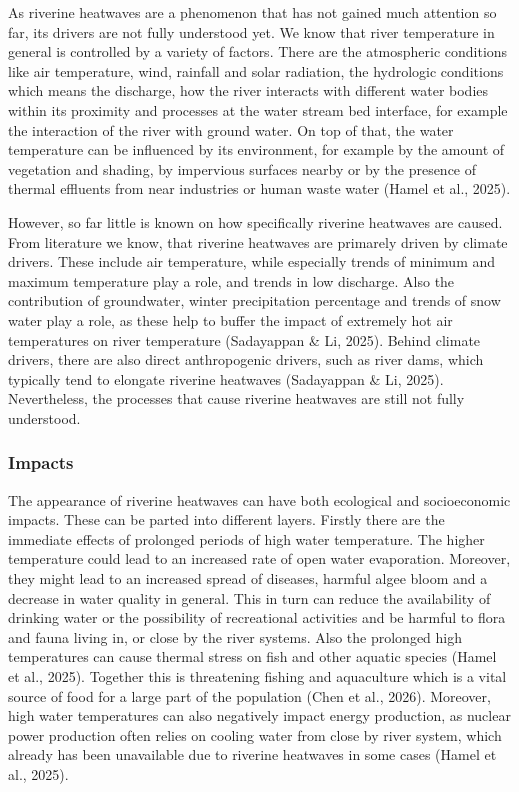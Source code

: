 \documentclass[
]{article}
\begin{document}
As riverine heatwaves are a phenomenon that has not gained much
attention so far, its drivers are not fully understood yet. We know that
river temperature in general is controlled by a variety of factors.
There are the atmospheric conditions like air temperature, wind,
rainfall and solar radiation, the hydrologic conditions which means the
discharge, how the river interacts with different water bodies within
its proximity and processes at the water stream bed interface, for
example the interaction of the river with ground water. On top of that,
the water temperature can be influenced by its environment, for example
by the amount of vegetation and shading, by impervious surfaces nearby
or by the presence of thermal effluents from near industries or human
waste water (Hamel et al., 2025).

However, so far little is known on how specifically riverine heatwaves
are caused. From literature we know, that riverine heatwaves are
primarely driven by climate drivers. These include air temperature,
while especially trends of minimum and maximum temperature play a role,
and trends in low discharge. Also the contribution of groundwater,
winter precipitation percentage and trends of snow water play a role, as
these help to buffer the impact of extremely hot air temperatures on
river temperature (Sadayappan \& Li, 2025). Behind climate drivers,
there are also direct anthropogenic drivers, such as river dams, which
typically tend to elongate riverine heatwaves (Sadayappan \& Li, 2025).
Nevertheless, the processes that cause riverine heatwaves are still not
fully understood.

\subsubsection{Impacts}\label{impacts}

The appearance of riverine heatwaves can have both ecological and
socioeconomic impacts. These can be parted into different layers.
Firstly there are the immediate effects of prolonged periods of high
water temperature. The higher temperature could lead to an increased
rate of open water evaporation. Moreover, they might lead to an
increased spread of diseases, harmful algee bloom and a decrease in
water quality in general. This in turn can reduce the availability of
drinking water or the possibility of recreational activities and be
harmful to flora and fauna living in, or close by the river systems.
Also the prolonged high temperatures can cause thermal stress on fish
and other aquatic species (Hamel et al., 2025). Together this is
threatening fishing and aquaculture which is a vital source of food for
a large part of the population (Chen et al., 2026). Moreover, high water
temperatures can also negatively impact energy production, as nuclear
power production often relies on cooling water from close by river
system, which already has been unavailable due to riverine heatwaves in
some cases (Hamel et al., 2025).
\end{document}
